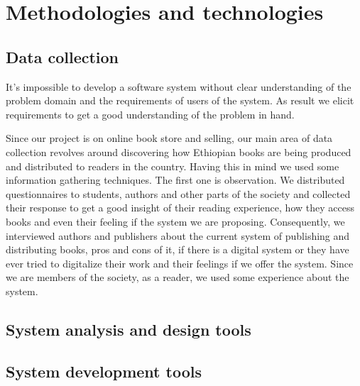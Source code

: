 	\section{Methodologies and technologies}
		\subsection{Data collection}

It's impossible to develop a software system without clear understanding of the problem domain and the requirements of users of the system. As result we elicit requirements to get a good understanding of the problem in hand.

Since our project is on online book store and selling, our main area of data collection revolves around discovering how Ethiopian books are being produced and distributed to readers in the country. Having this in mind we used some information gathering techniques. The first one is observation. We distributed questionnaires to students, authors and other parts of the society and collected their response to get a good insight of their reading experience, how they access books and even their feeling if the system we are proposing. Consequently, we interviewed authors and publishers about the current system of publishing and distributing books, pros and cons of it, if there is a digital system or they have ever tried to digitalize their work and their feelings if we offer the system. Since we are members of the society, as a reader, we used some experience about the system.

		\subsection{System analysis and design tools}

		\subsection{System development tools}

